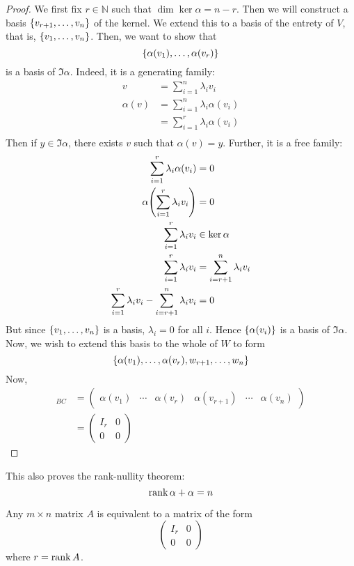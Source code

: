 \begin{proof}
	We first fix \( r \in \mathbb N \) such that \( \dim \ker \alpha = n - r \).
	Then we will construct a basis \( \qty{v_{r+1}, \dots, v_n} \) of the kernel.
	We extend this to a basis of the entrety of \( V \), that is, \( \qty{v_1,\dots,v_n} \).
	Then, we want to show that
	\[
		\qty{\alpha(v_1), \dots, \alpha(v_r)}
	\]
	is a basis of \( \Im \alpha \).
	Indeed, it is a generating family:
	\begin{align*}
		v         & = \sum_{i=1}^n \lambda_i v_i         \\
		\alpha(v) & = \sum_{i=1}^n \lambda_i \alpha(v_i) \\
		          & = \sum_{i=1}^r \lambda_i \alpha(v_i) \\
	\end{align*}
	Then if \( y \in \Im \alpha \), there exists \( v \) such that \( \alpha(v) = y \).
	Further, it is a free family:
	\begin{align*}
		\sum_{i=1}^r \lambda_i \alpha(v_i)                        & = 0                            \\
		\alpha\qty(\sum_{i=1}^r \lambda_i v_i)                    & = 0                            \\
		\sum_{i=1}^r \lambda_i v_i                                & \in \ker \alpha                \\
		\sum_{i=1}^r \lambda_i v_i                                & = \sum_{i=r+1}^n \lambda_i v_i \\
		\sum_{i=1}^r \lambda_i v_i - \sum_{i=r+1}^n \lambda_i v_i & = 0                            \\
	\end{align*}
	But since \( \qty{v_1, \dots, v_n} \) is a basis, \( \lambda_i = 0 \) for all \( i \).
	Hence \( \qty{\alpha(v_i)} \) is a basis of \( \Im \alpha \).
	Now, we wish to extend this basis to the whole of \( W \) to form
	\[
		\qty{\alpha(v_1), \dots, \alpha(v_r), w_{r+1}, \dots, w_n}
	\]
	Now,
	\begin{align*}
		[\alpha]_{BC} & = \begin{pmatrix}
			\alpha(v_1) & \cdots & \alpha(v_r) & \alpha(v_{r+1}) & \cdots & \alpha(v_n)
		\end{pmatrix} \\
		              & = \begin{pmatrix}
			I_r & 0 \\
			0   & 0
		\end{pmatrix}
	\end{align*}
\end{proof}
\begin{remark}
	This also proves the rank-nullity theorem:
	\[
		\rank \alpha + \null \alpha = n
	\]
\end{remark}
\begin{corollary}
	Any \( m \times n \) matrix \( A \) is equivalent to a matrix of the form
	\[
		\begin{pmatrix}
			I_r & 0 \\
			0   & 0
		\end{pmatrix}
	\]
	where \( r = \rank A \).
\end{corollary}

